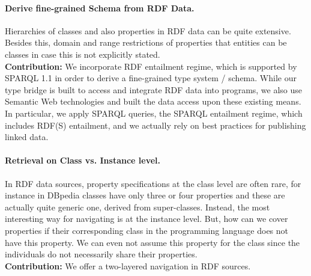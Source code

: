 \documentclass{llncs} %
\begin{document}
\paragraph*{\bf Derive fine-grained Schema from RDF Data.}
Hierarchies of classes and also properties in RDF data can be quite extensive.
Besides this, domain and range restrictions of properties that entities can be classes
in case this is not explicitly stated. \\
\textbf{Contribution:} We incorporate RDF entailment regime, which is supported by SPARQL 1.1
in order to derive a fine-grained type system / schema.
While our type bridge is built to access and integrate RDF data into programs,
we also use Semantic Web technologies and built the data access upon
these existing means. In particular, we apply SPARQL queries, the SPARQL entailment regime, which
includes RDF(S) entailment, and we actually rely on best practices for publishing linked data.


\paragraph*{\bf Retrieval on Class vs. Instance level.}
In RDF data sources, property specifications at the class level are often rare,
for instance in DBpedia classes have only three or four properties and these are actually
quite generic one, derived from super-classes. Instead, the most interesting way for navigating
is at the instance level. But, how can we cover properties if their corresponding class
in the programming language does not have this property. We can even not assume this property
for the class since the individuals do not necessarily share their properties. \\
\textbf{Contribution:}  We offer a two-layered navigation in RDF sources.

\end{document}
